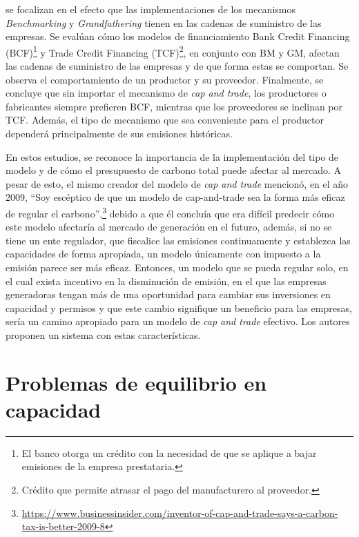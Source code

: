  se focalizan en el efecto que las implementaciones de los mecanismos \textit{Benchmarking} y \textit{Grandfathering} tienen en las cadenas de suministro de las empresas. Se evalúan cómo los modelos de financiamiento Bank Credit Financing (BCF)\footnote{El banco otorga un crédito con la necesidad de que se aplique a bajar emisiones de la empresa prestataria.\cite{wang_impact_2021}} y Trade Credit Financing (TCF)\footnote{Crédito que permite atrasar el pago del manufacturero al proveedor.\cite{wang_impact_2021}}, en conjunto con BM y GM, afectan las cadenas de suministro de las empresas y de que forma estas se comportan. Se observa el comportamiento de un productor y su proveedor. Finalmente, se concluye que sin importar el mecanismo de \textit{cap and trade}, los productores o fabricantes siempre prefieren BCF, mientras que los proveedores se inclinan por TCF. Además, el tipo de mecanismo que sea conveniente para el productor dependerá principalmente de sus emisiones históricas.
\vspace{2.5mm}

En estos estudios, se reconoce la importancia de la implementación del tipo de modelo y de cómo el presupuesto de carbono total puede afectar al mercado. A pesar de esto, el mismo creador del modelo de \textit{cap and trade} mencionó, en el año 2009, ``Soy escéptico de que un modelo de cap-and-trade sea la forma más eficaz de regular el carbono'',\footnote{{\scriptsize \url{https://www.businessinsider.com/inventor-of-cap-and-trade-says-a-carbon-tax-is-better-2009-8}}} debido a que él concluía que era difícil predecir cómo este modelo afectaría al mercado de generación en el futuro, además, si no se tiene un ente regulador, que fiscalice las emisiones continuamente y establezca las capacidades de forma apropiada, un modelo únicamente con impuesto a la emisión parece ser más eficaz. Entonces, un modelo que se pueda regular solo, en el cual exista incentivo en la disminución de emisión, en el que las empresas generadoras tengan más de una oportunidad para cambiar sus inversiones en capacidad y permisos y que este cambio signifique un beneficio para las empresas, sería un camino apropiado para un modelo de \textit{cap and trade} efectivo. Los autores  proponen un sistema con estas características.


\section{Problemas de equilibrio en capacidad} \label{c21}

